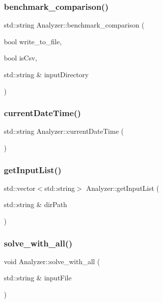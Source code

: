 \subsubsection{\texorpdfstring{benchmark\+\_\+comparison()}{benchmark\_comparison()}}
{\footnotesize\ttfamily std\+::string Analyzer\+::benchmark\+\_\+comparison (\begin{DoxyParamCaption}\item[{bool}]{write\+\_\+to\+\_\+file,  }\item[{bool}]{is\+Csv,  }\item[{std\+::string \&}]{input\+Directory }\end{DoxyParamCaption})}

\mbox{\label{class_analyzer_a9108681fee1078aed1af2ddee58cc55c}} 
\subsubsection{\texorpdfstring{current\+Date\+Time()}{currentDateTime()}}
{\footnotesize\ttfamily std\+::string Analyzer\+::current\+Date\+Time (\begin{DoxyParamCaption}{ }\end{DoxyParamCaption})}

\mbox{\label{class_analyzer_a39f511f54a8eb89626e7f0ece08c7d02}} 
\subsubsection{\texorpdfstring{get\+Input\+List()}{getInputList()}}
{\footnotesize\ttfamily std\+::vector$<$std\+::string$>$ Analyzer\+::get\+Input\+List (\begin{DoxyParamCaption}\item[{std\+::string \&}]{dir\+Path }\end{DoxyParamCaption})}

\mbox{\label{class_analyzer_a471ed64111b58f49cfee911b5db93ada}} 
\subsubsection{\texorpdfstring{solve\+\_\+with\+\_\+all()}{solve\_with\_all()}}
{\footnotesize\ttfamily void Analyzer\+::solve\+\_\+with\+\_\+all (\begin{DoxyParamCaption}\item[{std\+::string \&}]{input\+File }\end{DoxyParamCaption})}


